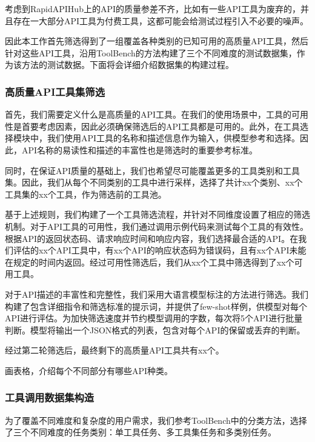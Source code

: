 考虑到RapidAPIHub上的API的质量参差不齐，比如有一些API工具为废弃的，并且存在一大部分API工具为付费工具，这都可能会给测试过程引入不必要的噪声。

因此本工作首先筛选得到了一组覆盖各种类别的已知可用的高质量API工具，然后针对这些API工具，沿用ToolBench的方法构建了三个不同难度的测试数据集，作为该方法的测试数据。下面将会详细介绍数据集的构建过程。


\subsubsection{高质量API工具集筛选}

首先，我们需要定义什么是高质量的API工具。在我们的使用场景中，工具的可用性是首要考虑因素，因此必须确保筛选后的API工具都是可用的。此外，在工具选择模块中，我们使用API工具的名称和描述信息作为输入，供模型参考和选择。因此，API名称的易读性和描述的丰富性也是筛选时的重要参考标准。

同时，在保证API质量的基础上，我们也希望尽可能覆盖更多的工具类别和工具集。因此，我们从每个不同类别的工具中进行采样，选择了共计xx个类别、xx个工具集的xx个工具，作为筛选前的工具池。

基于上述规则，我们构建了一个工具筛选流程，并针对不同维度设置了相应的筛选机制。对于API工具的可用性，我们通过调用示例代码来测试每个工具的有效性。根据API的返回状态码、请求响应时间和响应内容，我们选择最合适的API。在我们评估的xx个API工具中，有xx个API的响应状态码为错误码，且有xx个API未能在规定的时间内返回。经过可用性筛选后，我们从xx个工具中筛选得到了xx个可用工具。

对于API描述的丰富性和完整性，我们采用大语言模型标注的方法进行筛选。我们构建了包含详细指令和筛选标准的提示词，并提供了few-shot样例，供模型对每个API进行评估。为加快筛选速度并节约模型调用的字数，每次将5个API进行批量判断。模型将输出一个JSON格式的列表，包含对每个API的保留或丢弃的判断。

经过第二轮筛选后，最终剩下的高质量API工具共有xx个。

画表格，介绍每个不同部分有哪些API种类。

\subsubsection{工具调用数据集构造}

为了覆盖不同难度和复杂度的用户需求，我们参考ToolBench中的分类方法，选择了三个不同难度的任务类别：单工具任务、多工具集任务和多类别任务。

